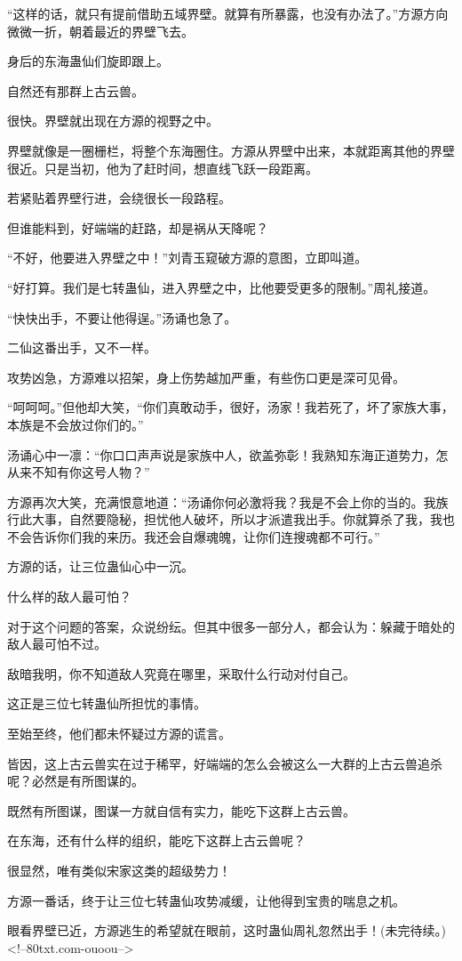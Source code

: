 \begin{this_body}
“这样的话，就只有提前借助五域界壁。就算有所暴露，也没有办法了。”方源方向微微一折，朝着最近的界壁飞去。

身后的东海蛊仙们旋即跟上。

自然还有那群上古云兽。

很快。界壁就出现在方源的视野之中。

界壁就像是一圈栅栏，将整个东海圈住。方源从界壁中出来，本就距离其他的界壁很近。只是当初，他为了赶时间，想直线飞跃一段距离。

若紧贴着界壁行进，会绕很长一段路程。

但谁能料到，好端端的赶路，却是祸从天降呢？

“不好，他要进入界壁之中！”刘青玉窥破方源的意图，立即叫道。

“好打算。我们是七转蛊仙，进入界壁之中，比他要受更多的限制。”周礼接道。

“快快出手，不要让他得逞。”汤诵也急了。

二仙这番出手，又不一样。

攻势凶急，方源难以招架，身上伤势越加严重，有些伤口更是深可见骨。

“呵呵呵。”但他却大笑，“你们真敢动手，很好，汤家！我若死了，坏了家族大事，本族是不会放过你们的。”

汤诵心中一凛：“你口口声声说是家族中人，欲盖弥彰！我熟知东海正道势力，怎从来不知有你这号人物？”

方源再次大笑，充满恨意地道：“汤诵你何必激将我？我是不会上你的当的。我族行此大事，自然要隐秘，担忧他人破坏，所以才派遣我出手。你就算杀了我，我也不会告诉你们我的来历。我还会自爆魂魄，让你们连搜魂都不可行。”

方源的话，让三位蛊仙心中一沉。

什么样的敌人最可怕？

对于这个问题的答案，众说纷纭。但其中很多一部分人，都会认为：躲藏于暗处的敌人最可怕不过。

敌暗我明，你不知道敌人究竟在哪里，采取什么行动对付自己。

这正是三位七转蛊仙所担忧的事情。

至始至终，他们都未怀疑过方源的谎言。

皆因，这上古云兽实在过于稀罕，好端端的怎么会被这么一大群的上古云兽追杀呢？必然是有所图谋的。

既然有所图谋，图谋一方就自信有实力，能吃下这群上古云兽。

在东海，还有什么样的组织，能吃下这群上古云兽呢？

很显然，唯有类似宋家这类的超级势力！

方源一番话，终于让三位七转蛊仙攻势减缓，让他得到宝贵的喘息之机。

眼看界壁已近，方源逃生的希望就在眼前，这时蛊仙周礼忽然出手！(未完待续。)<!--80txt.com-ouoou-->

\end{this_body}

